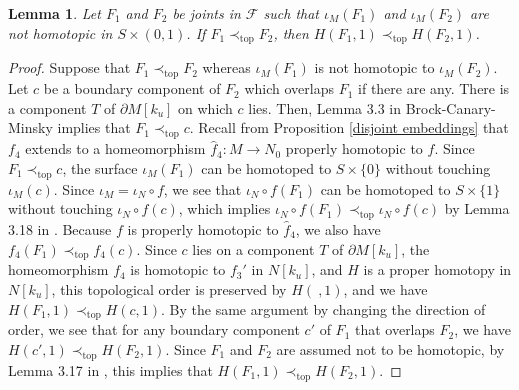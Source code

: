 \documentclass{amsart}
\newtheorem{lemma}[theorem]{Lemma}
\theoremstyle{definition}
\numberwithin{figure}{section}
\numberwithin{equation}{section}
\newcommand{\pretop}{\prec_\mathrm{top}}
\begin{document}
\begin{lemma}
\label{non-homotopic joints}
Let $F_1$ and $F_2$ be joints in $\mathcal F$ such that $\iota_M(F_1)$ and $\iota_M(F_2)$ are not homotopic in $S \times (0,1)$.
If $F_1 \pretop F_2$,
 then $H(F_1,1) \pretop H(F_2,1)$.
\end{lemma}
\begin{proof}
Suppose that $F_1 \pretop F_2$ whereas $\iota_M(F_1)$ is not homotopic to $\iota_M(F_2)$.
Let $c$ be a boundary component of $F_2$ which overlaps $F_1$ if there are any.
There is a component $T$ of $\partial M[k_u]$ on which $c$ lies.
Then, Lemma 3.3 in Brock-Canary-Minsky \cite{bcm} implies that $F_1 \pretop c$.
Recall from Proposition \ref{disjoint embeddings} that $f_4$ extends to a homeomorphism $\hat f_4: M \rightarrow N_0$ properly homotopic to $f$.
Since $ F_1 \pretop c$, the surface $\iota_M(F_1)$ can be homotoped to $S \times \{0\}$ without touching $\iota_M(c)$.
Since $\iota_M=\iota_N \circ f$, we see that $\iota_N \circ f ( F_1)$ can be homotoped to $S \times \{1\}$ without touching $\iota_N \circ f(c)$, which implies $\iota_N \circ f (F_1) \pretop \iota_N \circ f(c)$ by Lemma 3.18 in \cite{bcm}.
Because $f$ is properly homotopic to $\hat f_4$,
we also have $f_4(F_1) \pretop  f_4(c)$.
Since $c$ lies on a component $T$ of $\partial M[k_u]$,  the homeomorphism $f_4$ is homotopic to $f_3'$ in $N[k_u]$, and $H$ is a proper homotopy in $N[k_u]$,  this topological order is preserved by $H(\ ,1)$, and we have $H(F_1, 1) \pretop H(c,1)$.
By the same argument by changing the direction of order, we see that for any boundary component $c'$ of $ F_1$ that overlaps $F_2$, we have $H(c',1) \pretop H(F_2,1)$.
Since $F_1$ and $F_2$ are assumed not to be homotopic, by Lemma 3.17 in \cite{bcm}, this implies that $H(F_1, 1) \pretop H(F_2,1)$. 
%
\end{proof}
\end{document}
